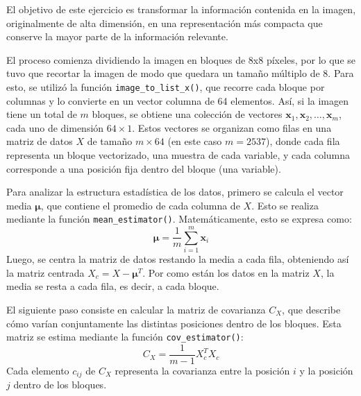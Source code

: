 \documentclass[a4paper,12pt]{article}
\begin{document}
El objetivo de este ejercicio es transformar la información contenida en la imagen, originalmente de alta dimensión, en una representación más compacta que conserve la mayor parte de la información relevante.

\vspace{1em}

El proceso comienza dividiendo la imagen en bloques de 8x8 píxeles, por lo que se tuvo que recortar la imagen de modo que quedara un tamaño múltiplo de 8. Para esto, se utilizó la función \texttt{image\_to\_list\_x()}, que recorre cada bloque por columnas y lo convierte en un vector columna de 64 elementos. Así, si la imagen tiene un total de $m$ bloques, se obtiene una colección de vectores $\mathbf{x}_1, \mathbf{x}_2, \ldots, \mathbf{x}_m$, cada uno de dimensión $64 \times 1$. Estos vectores se organizan como filas en una matriz de datos $X$ de tamaño $m \times 64$ (en este caso $m = 2537$), donde cada fila representa un bloque vectorizado, una muestra de cada variable, y cada columna corresponde a una posición fija dentro del bloque (una variable).

\vspace{1em}

Para analizar la estructura estadística de los datos, primero se calcula el vector media $\boldsymbol{\mu}$, que contiene el promedio de cada columna de $X$. Esto se realiza mediante la función \texttt{mean\_estimator()}. Matemáticamente, esto se expresa como:
\[
\boldsymbol{\mu} = \frac{1}{m} \sum_{i=1}^m \mathbf{x}_i
\]
Luego, se centra la matriz de datos restando la media a cada fila, obteniendo así la matriz centrada $X_c = X - \boldsymbol{\mu}^T$. Por como están los datos en la matriz $X$, la media se resta a cada fila, es decir, a cada bloque.

\vspace{1em}

El siguiente paso consiste en calcular la matriz de covarianza $C_X$, que describe cómo varían conjuntamente las distintas posiciones dentro de los bloques. Esta matriz se estima mediante la función \texttt{cov\_estimator()}:
\[
C_X = \frac{1}{m-1} X_c^T X_c
\]
Cada elemento $c_{ij}$ de $C_X$ representa la covarianza entre la posición $i$ y la posición $j$ dentro de los bloques.

\vspace{1em}
\end{document}
